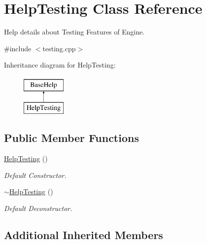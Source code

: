 \hypertarget{classHelpTesting}{}\section{Help\+Testing Class Reference}
\label{classHelpTesting}


Help details about Testing Features of Engine.  




{\ttfamily \#include $<$testing.\+cpp$>$}

Inheritance diagram for Help\+Testing\+:\begin{figure}[H]
\begin{center}
\leavevmode
\includegraphics[height=2.000000cm]{classHelpTesting}
\end{center}
\end{figure}
\subsection*{Public Member Functions}
\begin{DoxyCompactItemize}
\item 
\mbox{\label{classHelpTesting_a2f279473c60f94f8fa9839cf107793e3}} 
\mbox{\hyperlink{classHelpTesting_a2f279473c60f94f8fa9839cf107793e3}{Help\+Testing}} ()
\begin{DoxyCompactList}\small\item\em Default Constructor. \end{DoxyCompactList}\item 
\mbox{\label{classHelpTesting_a066899053913a718dbe287e08004d85f}} 
\mbox{\hyperlink{classHelpTesting_a066899053913a718dbe287e08004d85f}{$\sim$\+Help\+Testing}} ()
\begin{DoxyCompactList}\small\item\em Default Deconstructor. \end{DoxyCompactList}\end{DoxyCompactItemize}
\subsection*{Additional Inherited Members}


